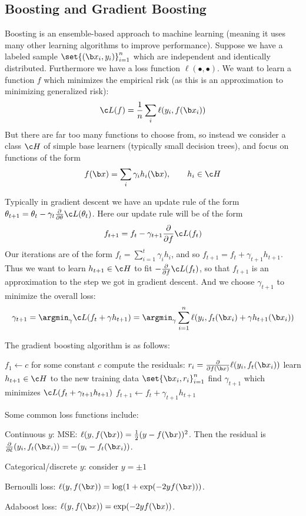 \subsection{Boosting and Gradient Boosting}

Boosting is an ensemble-based approach to machine learning (meaning it uses many other learning algorithms to improve performance).
Suppose we have a labeled sample $\set{(\b x_i,y_i)}_{i=1}^n$ which are independent and identically distributed.
Furthermore we have a loss function $\ell(\bullet,\bullet)$.
We want to learn a function $f$ which minimizes the empirical risk (as this is an approximation to minimizing generalized risk):
$$ \c L(f) = \frac1n\sum_i\ell(y_i,f(\b x_i)) $$
But there are far too many functions to choose from, so instead we consider a class $\c H$ of simple base learners (typically small decision trees), and focus on functions of the form
$$ f(\b x) = \sum_i\gamma_ih_i(\b x),\qquad h_i\in\c H $$

Typically in gradient descent we have an update rule of the form $\theta_{t+1}=\theta_t-\gamma_t\frac\partial{\partial\theta}\c L(\theta_t)$.
Here our update rule will be of the form
$$ f_{t+1} = f_t - \gamma_{t+1}\frac\partial{\partial f}\c L(f_t) $$
Our iterations are of the form $f_t=\sum_{i=1}^t\gamma_ih_i$, and so $f_{t+1}=f_t+\gamma_{t+1}h_{t+1}$.
Thus we want to learn $h_{t+1}\in\c H$ to fit $-\frac\partial{\partial f}\c L(f_t)$, so that $f_{t+1}$ is an approximation to the step we got in gradient descent.
And we choose $\gamma_{t+1}$ to minimize the overall loss:
$$ \gamma_{t+1} = \argmin_\gamma\c L(f_t+\gamma h_{t+1}) = \argmin_\gamma\sum_{i=1}^n\ell(y_i,f_t(\b x_i)+\gamma h_{t+1}(\b x_i)) $$

The gradient boosting algorithm is as follows:

\algorithm
{}
    \State $f_1\gets c$ for some constant $c$
        \State compute the residuals: $r_i=\frac\partial{\partial f(\b x)}\ell(y_i,f_t(\b x_i))$
        \State learn $h_{t+1}\in\c H$ to the new training data $\set{\b x_i,r_i}_{i=1}^n$
        \State find $\gamma_{t+1}$ which minimizes $\c L(f_t+\gamma_{t+1}h_{t+1})$
        \State $f_{t+1}\gets f_t+\gamma_{t+1}h_{t+1}$
    \EndFor
\EndFunc
\ealgorithm

Some common loss functions include:
\blist
    \item Continuous $y$: MSE: $\ell(y,f(\b x))=\frac12(y-f(\b x))^2$.
        Then the residual is $\frac\partial{\partial\ell}(y_i,f_t(\b x_i))=-(y_i-f_t(\b x_i))$.
    \item Categorical/discrete $y$: consider $y=\pm1$
        \benum
            \item Bernoulli loss: $\ell(y,f(\b x))=\log(1+\exp(-2yf(\b x)))$.
            \item Adaboost loss: $\ell(y,f(\b x))=\exp(-2yf(\b x))$.
        \eenum
\elist

